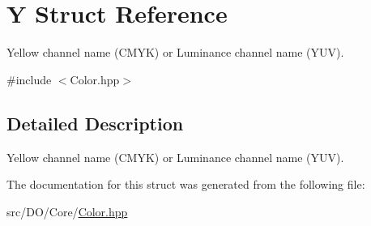 \hypertarget{struct_d_o_1_1_y}{\section{Y Struct Reference}
\label{struct_d_o_1_1_y}
}


Yellow channel name (C\-M\-Y\-K) or Luminance channel name (Y\-U\-V).  




{\ttfamily \#include $<$Color.\-hpp$>$}



\subsection{Detailed Description}
Yellow channel name (C\-M\-Y\-K) or Luminance channel name (Y\-U\-V). 

The documentation for this struct was generated from the following file\-:\begin{DoxyCompactItemize}
\item 
src/\-D\-O/\-Core/\hyperlink{_color_8hpp}{Color.\-hpp}\end{DoxyCompactItemize}
